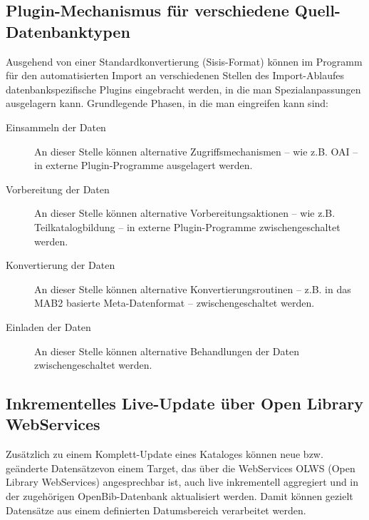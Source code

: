 \documentclass[11pt, twoside, a4paper, BCOR8mm, DIV12, bibtotoc,idxtotoc]{scrbook}
\begin{document}
\subsection{Plugin-Mechanismus für verschiedene Quell-Datenbanktypen}
Ausgehend von einer Standardkonvertierung (Sisis-Format) können im
Programm für den auto\-ma\-ti\-sier\-ten Import an verschiedenen Stellen des
Import-Ablaufes datenbankspezifische Plugins eingebracht werden, in die
man Spezialanpassungen ausgelagern kann. Grundlegende Phasen, in die
man eingreifen kann sind:
\begin{description}
\item[Einsammeln der Daten] An dieser Stelle können alternative
  Zugriffsmechanismen -- wie z.B. OAI --
  in externe Plugin-Programme ausgelagert werden.
\item[Vorbereitung der Daten] An dieser Stelle können alternative
  Vorbereitungsaktionen -- wie z.B. Teilkatalogbildung -- in externe
  Plugin-Programme zwischen\-ge\-schal\-tet werden.
\item[Konvertierung der Daten] An dieser Stelle können alternative
  Konvertierungsroutinen -- z.B. in das MAB2 basierte Meta-Datenformat
  -- zwischen\-ge\-schal\-tet werden.
\item[Einladen der Daten] An dieser Stelle können alternative
  Behandlungen der Daten zwischen\-ge\-schal\-tet werden.
\end{description}


\subsection{Inkrementelles Live-Update über Open Library WebServices}
Zusätzlich zu einem Komplett-Update eines Kataloges können neue
bzw. geänderte Datensätzevon einem Target, das über die WebServices
OLWS (Open Library WebServices) angesprechbar ist, auch live
inkrementell aggregiert und in der zugehörigen OpenBib-Datenbank
aktualisiert werden. Damit können gezielt Datensätze aus einem
definierten Datumsbereich verarbeitet werden.
\end{document}
